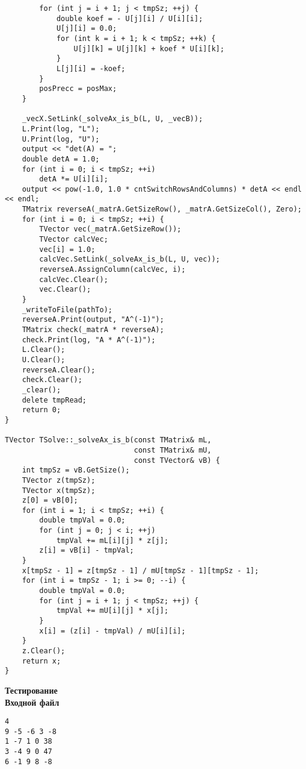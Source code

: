 \begin{lstlisting}
        for (int j = i + 1; j < tmpSz; ++j) {
            double koef = - U[j][i] / U[i][i];
            U[j][i] = 0.0;
            for (int k = i + 1; k < tmpSz; ++k) {
                U[j][k] = U[j][k] + koef * U[i][k];
            }
            L[j][i] = -koef;
        }
        posPrecc = posMax;
    }

    _vecX.SetLink(_solveAx_is_b(L, U, _vecB));	    
    L.Print(log, "L");
    U.Print(log, "U");    
    output << "det(A) = ";
    double detA = 1.0;
    for (int i = 0; i < tmpSz; ++i)
        detA *= U[i][i];
    output << pow(-1.0, 1.0 * cntSwitchRowsAndColumns) * detA << endl << endl;              
    TMatrix reverseA(_matrA.GetSizeRow(), _matrA.GetSizeCol(), Zero);
    for (int i = 0; i < tmpSz; ++i) {
        TVector vec(_matrA.GetSizeRow());
        TVector calcVec;        
        vec[i] = 1.0;        
        calcVec.SetLink(_solveAx_is_b(L, U, vec));		        
        reverseA.AssignColumn(calcVec, i);
        calcVec.Clear();
        vec.Clear();
    }
    _writeToFile(pathTo); 
    reverseA.Print(output, "A^(-1)");          
    TMatrix check(_matrA * reverseA);
    check.Print(log, "A * A^(-1)");    
    L.Clear();
    U.Clear();
    reverseA.Clear();
    check.Clear();
    _clear();
    delete tmpRead; 
    return 0;
}

TVector TSolve::_solveAx_is_b(const TMatrix& mL, 
                              const TMatrix& mU, 
                              const TVector& vB) {
    int tmpSz = vB.GetSize();    
	TVector z(tmpSz);
    TVector x(tmpSz);
	z[0] = vB[0];	
    for (int i = 1; i < tmpSz; ++i) {
        double tmpVal = 0.0;
        for (int j = 0; j < i; ++j)
            tmpVal += mL[i][j] * z[j];
        z[i] = vB[i] - tmpVal;
    }    
    x[tmpSz - 1] = z[tmpSz - 1] / mU[tmpSz - 1][tmpSz - 1];    
    for (int i = tmpSz - 1; i >= 0; --i) {
        double tmpVal = 0.0;
        for (int j = i + 1; j < tmpSz; ++j) {
            tmpVal += mU[i][j] * x[j];
        }
        x[i] = (z[i] - tmpVal) / mU[i][i];
    }
    z.Clear();
    return x;
}
\end{lstlisting}
\vspace{0.5cm}

\textbf{Тестирование}\\

\textbf{Входной файл}
\begin{verbatim}
4
9 -5 -6 3 -8
1 -7 1 0 38
3 -4 9 0 47
6 -1 9 8 -8
\end{verbatim}

